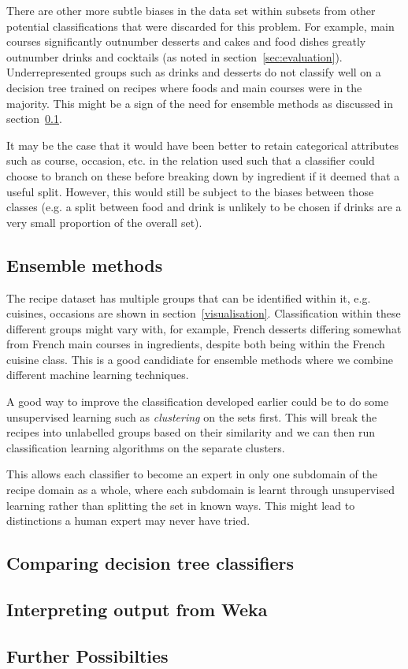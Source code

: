 \documentclass[11pt,a4paper]{article}
\begin{document}
There are other more subtle biases in the data set within subsets from other
potential classifications that were discarded for this problem. For example,
main courses significantly outnumber desserts and cakes and food dishes
greatly outnumber drinks and cocktails (as noted in section~\ref{sec:evaluation}).
Underrepresented groups such as drinks and desserts do not classify well
on a decision tree trained on recipes where foods and main courses were in
the majority. This might be a sign of the need for ensemble methods as discussed
in section~\ref{sec:ensemble}.

It may be the case that it would have been better to retain categorical
attributes such as course, occasion, etc. in the relation used such that
a classifier could choose to branch on these before breaking down by
ingredient if it deemed that a useful split. However, this would still
be subject to the biases between those classes (e.g. a split between
food and drink is unlikely to be chosen if drinks are a very small
proportion of the overall set).

\subsection{Ensemble methods}
\label{sec:ensemble}

The recipe dataset has multiple groups that can be identified within it, e.g.
cuisines, occasions are shown in section~\ref{visualisation}. Classification
within these different groups might vary with, for example, French desserts
differing somewhat from French main courses in ingredients, despite both
being within the French cuisine class. This is a good candidiate for ensemble
methods where we combine different machine learning techniques.

A good way to improve the classification developed earlier could be to do
some unsupervised learning such as \emph{clustering} on the sets first. This
will break the recipes into unlabelled groups based on their similarity and
we can then run classification learning algorithms on the separate clusters.

This allows each classifier to become an expert in only one subdomain of
the recipe domain as a whole, where each subdomain is learnt through
unsupervised learning rather than splitting the set in known ways. This might
lead to distinctions a human expert may never have tried.

\subsection{Comparing decision tree classifiers}

\subsection{Interpreting output from Weka}

\subsection{Further Possibilties}



\end{document}
